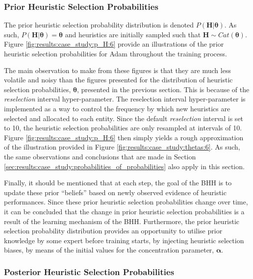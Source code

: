 \subsubsection{Prior Heuristic Selection Probabilities}\label{sec:results:case_study:priors}

The prior heuristic selection probability distribution is denoted $P(\boldsymbol{H} \vert \boldsymbol{\theta})$. As such, $P(\boldsymbol{H} \vert \boldsymbol{\theta}) = \boldsymbol{\theta}$ and heuristics are initially sampled such that $\boldsymbol{H} \sim Cat(\boldsymbol{\theta})$. Figure \ref{fig:results:case_study:p_H:6} provide an illustrations of the prior heuristic selection probabilities for \acs{Adam} throughout the training process.

The main observation to make from these figures is that they are much less volatile and noisy than the figures presented for the distribution of heuristic selection probabilities, $\boldsymbol{\theta}$, presented in the previous section. This is because of the \textit{reselection} interval hyper-parameter. The reselection interval hyper-parameter is implemented as a way to control the frequency by which new heuristics are selected and allocated to each entity. Since the default \textit{reselection} interval is set to 10, the heuristic selection probabilities are only resampled at intervals of 10. Figure \ref{fig:results:case_study:p_H:6} then simply yields a rough approximation of the illustration provided in Figure \ref{fig:results:case_study:thetas:6}. As such, the same observations and conclusions that are made in Section \ref{sec:results:case_study:probabilities_of_probabilities} also apply in this section.

Finally, it should be mentioned that at each step, the goal of the \acs{BHH} is to update these prior ``beliefs'' based on newly observed evidence of heuristic performances. Since these prior heuristic selection probabilities change over time, it can be concluded that the change in prior heuristic selection probabilities is a result of the learning mechanism of the \acs{BHH}. Furthermore, the prior heuristic selection probability distribution provides an opportunity to utilise prior knowledge by some expert before training starts, by injecting heuristic selection biases, by means of the initial values for the concentration parameter, $\boldsymbol{\alpha}$.

\subsubsection{Posterior Heuristic Selection Probabilities}\label{sec:results:case_study:posteriors}

